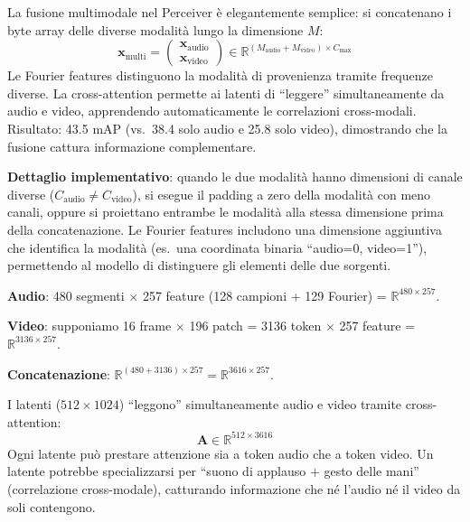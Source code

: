 \documentclass[12pt,a4paper]{article}
\begin{document}
\begin{notabox}
La fusione multimodale nel Perceiver \`e elegantemente semplice: si concatenano i byte array delle diverse modalit\`a lungo la dimensione $M$:
\[
    \mathbf{x}_{\text{multi}} = \begin{pmatrix} \mathbf{x}_{\text{audio}} \\ \mathbf{x}_{\text{video}} \end{pmatrix} \in \mathbb{R}^{(M_{\text{audio}} + M_{\text{video}}) \times C_{\text{max}}}
\]
Le Fourier features distinguono la modalit\`a di provenienza tramite frequenze diverse. La cross-attention permette ai latenti di ``leggere'' simultaneamente da audio e video, apprendendo automaticamente le correlazioni cross-modali. Risultato: 43.5 mAP (vs.\ 38.4 solo audio e 25.8 solo video), dimostrando che la fusione cattura informazione complementare.

\textbf{Dettaglio implementativo}: quando le due modalit\`a hanno dimensioni di canale diverse ($C_{\text{audio}} \neq C_{\text{video}}$), si esegue il padding a zero della modalit\`a con meno canali, oppure si proiettano entrambe le modalit\`a alla stessa dimensione prima della concatenazione. Le Fourier features includono una dimensione aggiuntiva che identifica la modalit\`a (es.\ una coordinata binaria ``audio=0, video=1''), permettendo al modello di distinguere gli elementi delle due sorgenti.
\end{notabox}

\begin{examplebox}
\textbf{Audio}: 480 segmenti $\times$ 257 feature (128 campioni + 129 Fourier) = $\mathbb{R}^{480 \times 257}$.

\textbf{Video}: supponiamo 16 frame $\times$ 196 patch = 3136 token $\times$ 257 feature = $\mathbb{R}^{3136 \times 257}$.

\textbf{Concatenazione}: $\mathbb{R}^{(480 + 3136) \times 257} = \mathbb{R}^{3616 \times 257}$.

I latenti ($512 \times 1024$) ``leggono'' simultaneamente audio e video tramite cross-attention:
\[
    \mathbf{A} \in \mathbb{R}^{512 \times 3616}
\]
Ogni latente pu\`o prestare attenzione sia a token audio che a token video. Un latente potrebbe specializzarsi per ``suono di applauso + gesto delle mani'' (correlazione cross-modale), catturando informazione che n\'e l'audio n\'e il video da soli contengono.
\end{examplebox}
\end{document}

